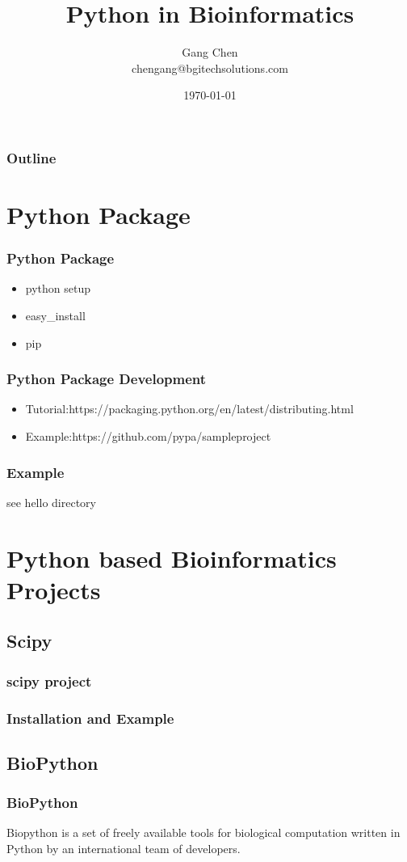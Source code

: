 \documentclass[UTF8]{beamer}
\title{Python in Bioinformatics}
\author{Gang Chen\\ chengang@bgitechsolutions.com}
\date{\today}
\begin{document}
\begin{frame}
\titlepage
\end{frame}

\begin{frame}[t]\frametitle{Outline}
\tableofcontents[hideallsubsections]
\end{frame}

\section{Python Package}
\begin{frame}
  \frametitle{Python Package}
  \begin{itemize}
    \item python setup
    \item easy_install
    \item pip
  \end{itemize}
\end{frame}

\begin{frame}
  \frametitle{Python Package Development}
  \begin{itemize}
    \item Tutorial:https://packaging.python.org/en/latest/distributing.html
    \item Example:https://github.com/pypa/sampleproject
  \end{itemize}
\end{frame}

\begin{frame}
  \frametitle{Example}
  see hello directory
\end{frame}

\section{Python based Bioinformatics Projects}
\subsection{Scipy}
\begin{frame}
  \frametitle{scipy project}
\end{frame}

\begin{frame}
  \frametitle{Installation and Example}
\end{frame}
\subsection{BioPython}
\begin{frame}
  \frametitle{BioPython}
  Biopython is a set of freely available tools for biological computation
  written in Python by an international team of developers.
\end{frame}
\end{document}
